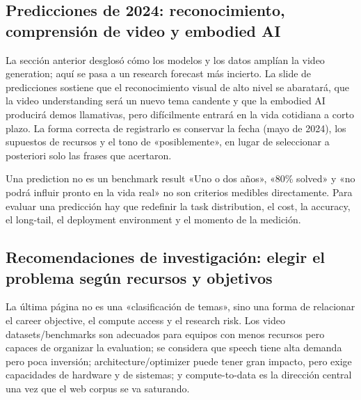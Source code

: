 
\subsection{Predicciones de 2024: reconocimiento, comprensión de video y embodied AI}

La sección anterior desglosó cómo los modelos y los datos amplían la video generation; aquí se pasa a un research forecast más incierto. La slide de predicciones sostiene que el reconocimiento visual de alto nivel se abaratará, que la video understanding será un nuevo tema candente y que la embodied AI producirá demos llamativas, pero difícilmente entrará en la vida cotidiana a corto plazo. La forma correcta de registrarlo es conservar la fecha (mayo de 2024), los supuestos de recursos y el tono de «posiblemente», en lugar de seleccionar a posteriori solo las frases que acertaron.


\begin{warningbox}{Una prediction no es un benchmark result}
«Uno o dos años», «80\% solved» y «no podrá influir pronto en la vida real» no son criterios medibles directamente. Para evaluar una predicción hay que redefinir la task distribution, el cost, la accuracy, el long-tail, el deployment environment y el momento de la medición.
\end{warningbox}


\subsection{Recomendaciones de investigación: elegir el problema según recursos y objetivos}

La última página no es una «clasificación de temas», sino una forma de relacionar el career objective, el compute access y el research risk. Los video datasets/benchmarks son adecuados para equipos con menos recursos pero capaces de organizar la evaluation; se considera que speech tiene alta demanda pero poca inversión; architecture/optimizer puede tener gran impacto, pero exige capacidades de hardware y de sistemas; y compute-to-data es la dirección central una vez que el web corpus se va saturando.

